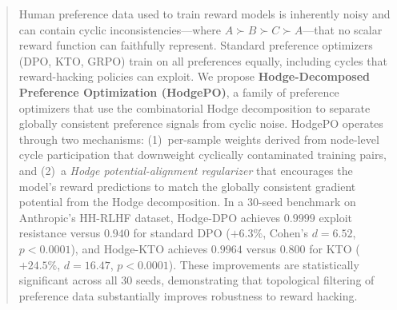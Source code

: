 \documentclass{article}
\begin{document}

\printAffiliationsAndNotice{\icmlEqualContribution}

\begin{abstract}
Human preference data used to train reward models is inherently noisy and can contain cyclic inconsistencies---where $A \succ B \succ C \succ A$---that no scalar reward function can faithfully represent. Standard preference optimizers (DPO, KTO, GRPO) train on all preferences equally, including cycles that reward-hacking policies can exploit. We propose \textbf{Hodge-Decomposed Preference Optimization (HodgePO)}, a family of preference optimizers that use the combinatorial Hodge decomposition to separate globally consistent preference signals from cyclic noise. HodgePO operates through two mechanisms: (1)~per-sample weights derived from node-level cycle participation that downweight cyclically contaminated training pairs, and (2)~a \emph{Hodge potential-alignment regularizer} that encourages the model's reward predictions to match the globally consistent gradient potential from the Hodge decomposition. In a 30-seed benchmark on Anthropic's HH-RLHF dataset, Hodge-DPO achieves $\mathbf{0.9999}$ exploit resistance versus $0.940$ for standard DPO ($+6.3\%$, Cohen's $d = 6.52$, $p < 0.0001$), and Hodge-KTO achieves $\mathbf{0.9964}$ versus $0.800$ for KTO ($+24.5\%$, $d = 16.47$, $p < 0.0001$). These improvements are statistically significant across all 30 seeds, demonstrating that topological filtering of preference data substantially improves robustness to reward hacking.
\end{abstract}

\end{document}
